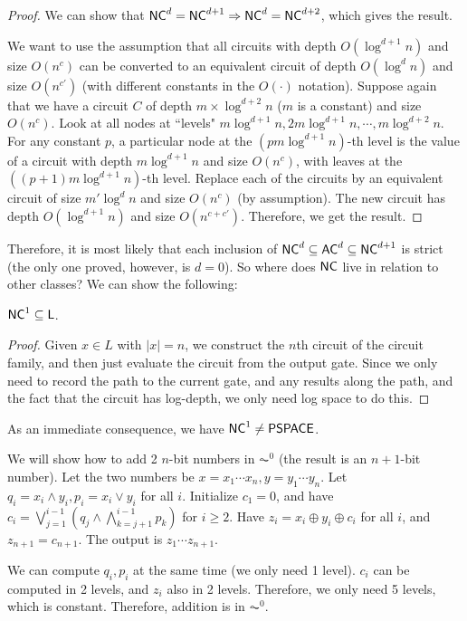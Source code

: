 \begin{proof}
\par We can show that ${\mathsf{NC}}^d = {\mathsf{NC}}^{d+1} \Rightarrow {\ensuremath{\mathsf{NC}}}^{d} = {\mathsf{NC}}^{d+2}$, which gives the result.

\par We want to use the assumption that all circuits with depth $O(\log^{d+1} n)$ and size $O(n^c)$ can be converted to an equivalent circuit of depth $O(\log^{d} n)$ and size $O(n^{c'})$ (with different constants in the $O(\cdot)$ notation). Suppose again that we have a circuit $C$ of depth $m \times \log^{d+2} n$ ($m$ is a constant) and size $O(n^c)$. Look at all nodes at ``levels" $m \log^{d+1} n, 2m \log^{d+1} n, \cdots, m\log^{d+2} n$. For any constant $p$, a particular node at the $(pm\log^{d+1} n)$-th level is the value of a circuit with depth $m\log^{d+1} n$ and size $O(n^c)$, with leaves at the $((p+1)m\log^{d+1} n)$-th level. Replace each of the circuits by an equivalent circuit of size $m'\log^{d} n$ and size $O(n^c)$ (by assumption). The new circuit has depth $O(\log^{d+1} n)$ and size $O(n^{c+c'})$. Therefore, we get the result. 
\end{proof}
Therefore, it is most likely that each inclusion of ${\mathsf{NC}}^d \subseteq {\ensuremath{\mathsf{AC}}}^d \subseteq {\ensuremath{\mathsf{NC}}}^{d+1}$ is strict (the only one proved, however, is $d = 0$).  So where does ${\mathsf{NC}}$ live in relation to other classes? We can show the following:
\begin{theorem}
${\mathsf{NC}}^1 \subseteq {\ensuremath{\mathsf{L}}}$.
\end{theorem}

\begin{proof}
Given $x \in L$ with $|x| = n$, we construct the $n$th circuit of the circuit family, and then just evaluate the circuit from the output gate. Since we only need to record the path to the current gate, and any results along the path, and the fact that the circuit has log-depth, we only need log space to do this.
\end{proof}
As an immediate consequence, we have ${\mathsf{NC}}^1 \ne {\ensuremath{\mathsf{PSPACE}}}$. 

\begin{example}
We will show how to add 2 $n$-bit numbers in $\AC^0$ (the result is an $n+1$-bit number). Let the two numbers be $x = x_1\cdots x_n, y = y_1\cdots y_n$. Let $q_i = x_i \wedge y_i, p_i = x_i \vee y_i$ for all $i$. Initialize $c_1 = 0$, and have $c_i = \bigvee_{j=1}^{i-1} (q_j \wedge \bigwedge_{k=j+1}^{i-1}p_k)$ for $i \ge 2$. Have $z_i = x_i \oplus y_i \oplus c_i$ for all $i$, and $z_{n+1} = c_{n+1}$. The output is $z_1\cdots z_{n+1}$. 

\par We can compute $q_i, p_i$ at the same time (we only need 1 level). $c_i$ can be computed in 2 levels, and $z_i$ also in 2 levels. Therefore, we only need 5 levels, which is constant. Therefore, addition is in $\AC^0$. 
\end{example}

